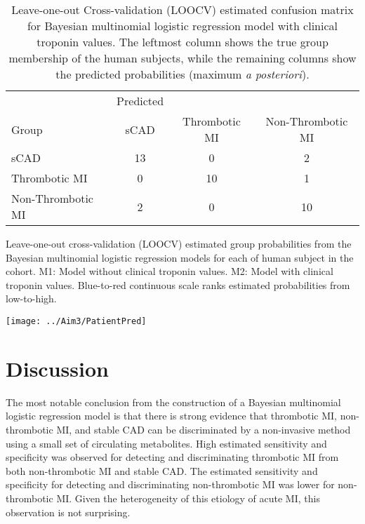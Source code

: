 \begin{DoubleSpace*}
  \begin{table}[H]
  	\centering
  	\caption[Leave-one-out Cross-validation (LOOCV) estimated confusion matrix for Bayesian multinomial logistic regression model with clinical troponin values]{Leave-one-out Cross-validation (LOOCV) estimated confusion matrix for Bayesian multinomial logistic regression model with clinical troponin values. The leftmost column shows the true group membership of the human subjects, while the remaining columns show the predicted probabilities (maximum \emph{a posteriori}).}
  	\label{tab:modelRes2}
\begin{tabular}{l|ccc}
& Predicted & & \\
Group  &     sCAD & Thrombotic MI & Non-Thrombotic MI \\
\hline
sCAD   &     13    &     0    &     2\\
Thrombotic MI  &  0    &    10    &     1\\
Non-Thrombotic MI &   2  &   0 &    10
\end{tabular}
  \end{table}
  
\begin{table}[H]
  	\centering
 	  	\caption[Leave-one-out cross-validation (LOOCV) estimated group probabilities from the Bayesian multinomial logistic regression models for each of human subject in the cohort.]{Leave-one-out cross-validation (LOOCV) estimated group probabilities from the Bayesian multinomial logistic regression models for each of human subject in the cohort. M1: Model without clinical troponin values. M2: Model with clinical troponin values. Blue-to-red continuous scale ranks estimated probabilities from low-to-high.}
	  	\label{tab:modelRes3}
 	\texttt{[image: ../Aim3/PatientPred]}
\end{table}

\section{Discussion}
The most notable conclusion from the construction of a Bayesian multinomial logistic regression model is that there is strong evidence that thrombotic MI, non-thrombotic MI, and stable CAD can be discriminated by a non-invasive method using a small set of circulating metabolites. High estimated sensitivity and specificity was observed for detecting and discriminating thrombotic MI from both non-thrombotic MI and stable CAD. The estimated sensitivity and specificity for detecting and discriminating non-thrombotic MI was lower for non-thrombotic MI. Given the heterogeneity of this etiology of acute MI, this observation is not surprising. 


\end{DoubleSpace*}
